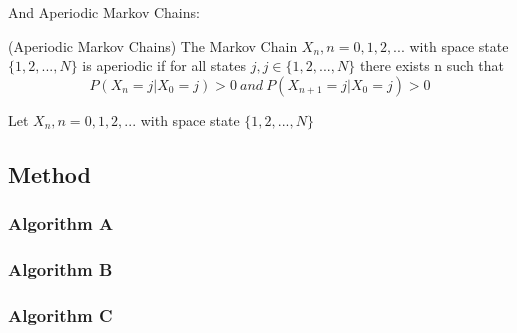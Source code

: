 And Aperiodic Markov Chains:

\begin{definition}{(Aperiodic Markov Chains)} 
The Markov Chain $X_n,n = 0,1,2,...$ with space state $\{1,2,...,N\}$
is aperiodic if for all states $j,j ∈ \{1,2,...,N\}$ there exists n such that \begin{equation}
    P(X_n = j|X_0 = j) >0 \ and \  P(X_{n+1} = j|X_0 = j) >0
\end{equation}
\end{definition}

\begin{theorem}
    Let $X_n,n = 0,1,2,...$ with space state $\{1,2,...,N\}$
\end{theorem}




\subsection{Method}
\label{sec:method1}


\subsubsection{Algorithm A}
\label{sec:alg1A}

\subsubsection{Algorithm B}
\label{sec:alg1B}

\subsubsection{Algorithm C}
\label{sec:alg1C}



